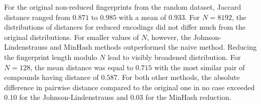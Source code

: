 For the original non-reduced fingerprints from the random dataset, Jaccard distance ranged from \( 0.871 \) to \( 0.985 \) with a mean of \( 0.933 \). For \( N = 8192 \), the distributions of distances for reduced encodings did not differ much from the original distributions. For smaller values of \( N \), however, the Johnson-Lindenstrauss and MinHash methods outperformed the naive method. Reducing the fingerprint length modulo \( N \) lead to visibly broadened distribution. For \( N = 128 \), the mean distance was equal to \( 0.715 \) with the most similar pair of compounds having distance of \( 0.587 \). For both other methods, the absolute difference in pairwise distance compared to the original one in no case exceeded \( 0.10 \) for the Johnson-Lindenstrauss and \( 0.03 \) for the MinHash reduction.